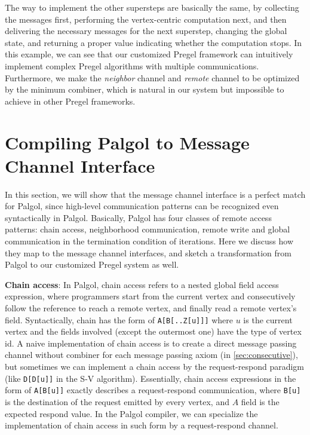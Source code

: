\documentclass{sokendai_thesis} %
\begin{document}
The way to implement the other supersteps are basically the same, by collecting the messages first, performing the vertex-centric computation next, and then delivering the necessary messages for the next superstep, changing the global state, and returning a proper value indicating whether the computation stops.
In this example, we can see that our customized Pregel framework can intuitively implement complex Pregel algorithms with multiple communications.
Furthermore, we make the \emph{neighbor} channel and \emph{remote} channel to be optimized by the minimum combiner, which is natural in our system but impossible to achieve in other Pregel frameworks.

\section{Compiling Palgol to Message Channel Interface}

In this section, we will show that the message channel interface is a perfect match for Palgol, since high-level communication patterns can be recognized even syntactically in Palgol.
Basically, Palgol has four classes of remote access patterns: chain access, neighborhood communication, remote write and global communication in the termination condition of iterations.
Here we discuss how they map to the message channel interfaces, and sketch a transformation from Palgol to our customized Pregel system as well.

\textbf{Chain access}: In Palgol, chain access refers to a nested global field access expression, where programmers start from the current vertex and consecutively follow the reference to reach a remote vertex, and finally read a remote vertex's field.
Syntactically, chain has the form of \texttt{A[B[..Z[u]]]} where $u$ is the current vertex and the fields involved (except the outermost one) have the type of vertex id.
A naive implementation of chain access is to create a direct message passing channel without combiner for each message passing axiom (in \autoref{sec:consecutive}), but sometimes we can implement a chain access by the request-respond paradigm (like \texttt{D[D[u]]} in the S-V algorithm).
Essentially, chain access expressions in the form of \texttt{A[B[u]]} exactly describes a request-respond communication, where \texttt{B[u]} is the destination of the request emitted by every vertex, and $A$ field is the expected respond value.
In the Palgol compiler, we can specialize the implementation of chain access in such form by a request-respond channel.
\end{document}
